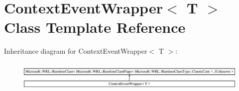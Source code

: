 \hypertarget{class_context_event_wrapper}{}\section{Context\+Event\+Wrapper$<$ T $>$ Class Template Reference}
\label{class_context_event_wrapper}
Inheritance diagram for Context\+Event\+Wrapper$<$ T $>$\+:\begin{figure}[H]
\begin{center}
\leavevmode
\includegraphics[height=1.473684cm]{d2/dcc/class_context_event_wrapper}
\end{center}
\end{figure}
